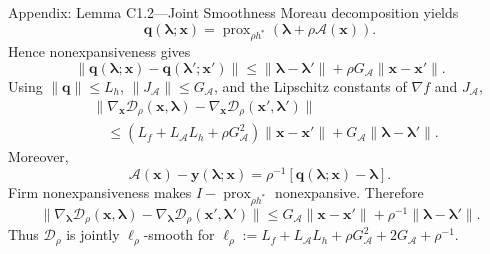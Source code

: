 \documentclass[handout,compress,9pt]{beamer}
\newcommand{\bx}{\bm{x}}
\newcommand{\by}{\bm{y}}
\newcommand{\bq}{\bm{q}}
\newcommand{\blmbd}{\bm{\lambda}}
\newcommand{\calA}{\mathcal{A}}
\newcommand{\prox}{\operatorname{prox}}
\begin{document}
\begin{frame}{Appendix: Lemma C1.2---Joint Smoothness
\hfill\hyperlink{appendix:contents}{}}
\scriptsize
Moreau decomposition yields
\begin{equation*}
  \bq(\blmbd;\bx)=\prox_{\rho h^*}
  (\blmbd+\rho\calA(\bx)).
\end{equation*}
Hence nonexpansiveness gives
\begin{equation*}
  \|\bq(\blmbd;\bx)-\bq(\blmbd';\bx')\|
  \le \|\blmbd-\blmbd'\|+\rho G_{\calA}\|\bx-\bx'\|.
\end{equation*}
Using $\|\bq\|\le L_h$, $\|J_{\calA}\|\le G_{\calA}$, and the Lipschitz
constants of $\nabla f$ and $J_{\calA}$,
\begin{equation*}
\begin{aligned}
  &\|\nabla_{\bx}\mathcal D_\rho(\bx,\blmbd)
  -\nabla_{\bx}\mathcal D_\rho(\bx',\blmbd')\|\\
  &\quad\le
  (L_f+L_{\calA}L_h+\rho G_{\calA}^2)\|\bx-\bx'\|
  +G_{\calA}\|\blmbd-\blmbd'\|.
\end{aligned}
\end{equation*}
Moreover,
\begin{equation*}
  \calA(\bx)-\by(\blmbd;\bx)
  =\rho^{-1}[\bq(\blmbd;\bx)-\blmbd].
\end{equation*}
Firm nonexpansiveness makes $I-\prox_{\rho h^*}$ nonexpansive.  Therefore
\begin{equation*}
  \|\nabla_{\blmbd}\mathcal D_\rho(\bx,\blmbd)
  -\nabla_{\blmbd}\mathcal D_\rho(\bx',\blmbd')\|
  \le G_{\calA}\|\bx-\bx'\|+\rho^{-1}\|\blmbd-\blmbd'\|.
\end{equation*}
Thus $\mathcal D_\rho$ is jointly $\ell_\rho$-smooth for
$\ell_\rho:=L_f+L_{\calA}L_h+\rho G_{\calA}^2+2G_{\calA}+\rho^{-1}$.
\end{frame}
\end{document}
